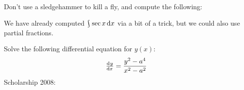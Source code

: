 \begin{questions}
  \questioE Don't use a sledgehammer to kill a fly, and compute the following:
  \questioO We have already computed $ \rint \sec x \dif{x} $ via a bit of a trick, but we could also use partial fractions.
  \questioS Solve the following differential equation for $ y(x) $:
    \begin{displaymath}
      \od{y}{x} = \frac{y^2 - a^4}{x^2 - a^2}
    \end{displaymath}
  \questioS Scholarship 2008:
\end{questions}
